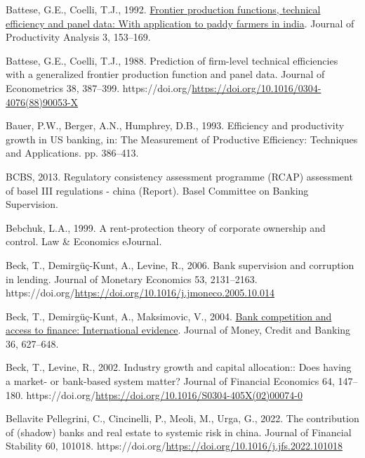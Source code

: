 \documentclass[
  12pt,
  a4paper,
  DIV=11,
  numbers=noendperiod]{scrreprt}
\newlength{\cslhangindent}
\newenvironment{CSLReferences}[2] %
 {\begin{list}{}{%
  \setlength{\itemindent}{0pt}
  \setlength{\leftmargin}{0pt}
  \setlength{\parsep}{0pt}
  \ifodd #1
   \setlength{\leftmargin}{\cslhangindent}
   \setlength{\itemindent}{-1\cslhangindent}
  \fi
  \setlength{\itemsep}{#2\baselineskip}}}
 {\end{list}}
\begin{document}
\begin{CSLReferences}{1}{0}
Battese, G.E., Coelli, T.J., 1992.
\href{http://www.jstor.org/stable/41770578}{Frontier production
functions, technical efficiency and panel data: With application to
paddy farmers in india}. Journal of Productivity Analysis 3, 153--169.

Battese, G.E., Coelli, T.J., 1988. Prediction of firm-level technical
efficiencies with a generalized frontier production function and panel
data. Journal of Econometrics 38, 387--399.
https://doi.org/\url{https://doi.org/10.1016/0304-4076(88)90053-X}

Bauer, P.W., Berger, A.N., Humphrey, D.B., 1993. Efficiency and
productivity growth in US banking, in: The Measurement of Productive
Efficiency: Techniques and Applications. pp. 386--413.

BCBS, 2013. Regulatory consistency assessment programme (RCAP)
assessment of basel III regulations - china (Report). Basel Committee on
Banking Supervision.

Bebchuk, L.A., 1999. A rent-protection theory of corporate ownership and
control. Law \& Economics eJournal.

Beck, T., Demirgüç-Kunt, A., Levine, R., 2006. Bank supervision and
corruption in lending. Journal of Monetary Economics 53, 2131--2163.
https://doi.org/\url{https://doi.org/10.1016/j.jmoneco.2005.10.014}

Beck, T., Demirgüç-Kunt, A., Maksimovic, V., 2004.
\href{http://www.jstor.org.queens.ezp1.qub.ac.uk/stable/3838958}{Bank
competition and access to finance: International evidence}. Journal of
Money, Credit and Banking 36, 627--648.

Beck, T., Levine, R., 2002. Industry growth and capital allocation::
Does having a market- or bank-based system matter? Journal of Financial
Economics 64, 147--180.
https://doi.org/\url{https://doi.org/10.1016/S0304-405X(02)00074-0}

Bellavite Pellegrini, C., Cincinelli, P., Meoli, M., Urga, G., 2022. The
contribution of (shadow) banks and real estate to systemic risk in
china. Journal of Financial Stability 60, 101018.
https://doi.org/\url{https://doi.org/10.1016/j.jfs.2022.101018}


\end{CSLReferences}
\end{document}
